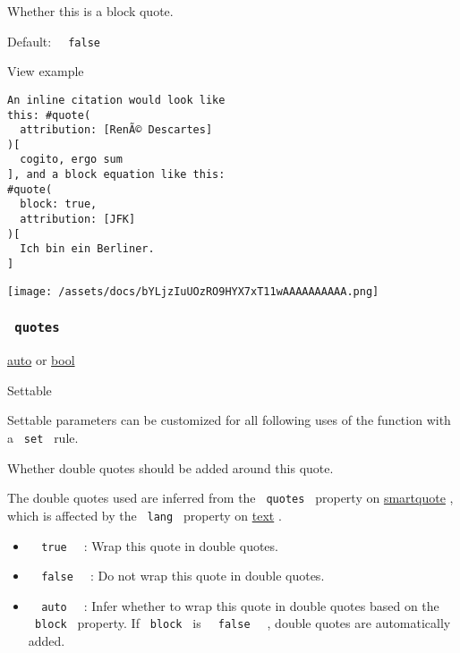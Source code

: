 Whether this is a block quote.

Default: \texttt{\ }{\texttt{\ false\ }}\texttt{\ }


View example

\begin{verbatim}
An inline citation would look like
this: #quote(
  attribution: [RenÃ© Descartes]
)[
  cogito, ergo sum
], and a block equation like this:
#quote(
  block: true,
  attribution: [JFK]
)[
  Ich bin ein Berliner.
]
\end{verbatim}

\texttt{[image: /assets/docs/bYLjzIuUOzRO9HYX7xT11wAAAAAAAAAA.png]}

\subsubsection{\texorpdfstring{\texttt{\ quotes\ }}{ quotes }}\label{parameters-quotes}

\href{/docs/reference/foundations/auto/}{auto} {or}
\href{/docs/reference/foundations/bool/}{bool}

{{ Settable }}

\label{parameters-quotes-settable-tooltip}
Settable parameters can be customized for all following uses of the
function with a \texttt{\ set\ } rule.

Whether double quotes should be added around this quote.

The double quotes used are inferred from the \texttt{\ quotes\ }
property on \href{/docs/reference/text/smartquote/}{smartquote} , which
is affected by the \texttt{\ lang\ } property on
\href{/docs/reference/text/text/}{text} .

\begin{itemize}
\tightlist
\item
  \texttt{\ }{\texttt{\ true\ }}\texttt{\ } : Wrap this quote in double
  quotes.
\item
  \texttt{\ }{\texttt{\ false\ }}\texttt{\ } : Do not wrap this quote in
  double quotes.
\item
  \texttt{\ }{\texttt{\ auto\ }}\texttt{\ } : Infer whether to wrap this
  quote in double quotes based on the \texttt{\ block\ } property. If
  \texttt{\ block\ } is \texttt{\ }{\texttt{\ false\ }}\texttt{\ } ,
  double quotes are automatically added.
\end{itemize}

